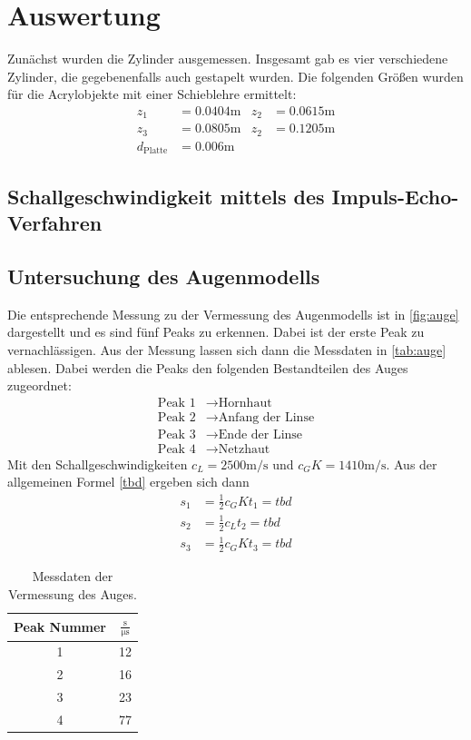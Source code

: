 \section{Auswertung}
\label{sec:Auswertung}

Zunächst wurden die Zylinder ausgemessen. Insgesamt gab es vier verschiedene Zylinder, die gegebenenfalls auch gestapelt wurden.
Die folgenden Größen wurden für die Acrylobjekte mit einer Schieblehre ermittelt:
\begin{align*}
  z_1 &= 0.0404 \unit\meter & z_2 &= 0.0615 \unit\meter \\
  z_3 &= 0.0805 \unit\meter & z_2 &= 0.1205 \unit\meter \\
  d_\text{Platte} &= 0.006 \unit\meter
\end{align*}

\subsection{Schallgeschwindigkeit mittels des Impuls-Echo-Verfahren}

\subsection{Untersuchung des Augenmodells}

Die entsprechende Messung zu der Vermessung des Augenmodells ist in \autoref{fig:auge} dargestellt
und es sind fünf Peaks zu erkennen. Dabei ist der erste Peak zu vernachlässigen.
Aus der Messung lassen sich dann die Messdaten in \autoref{tab:auge} ablesen.
Dabei werden die Peaks den folgenden Bestandteilen des Auges zugeordnet:
\begin{align*}
  \text{Peak 1} &\to \text{Hornhaut} \\
  \text{Peak 2} &\to \text{Anfang der Linse} \\
  \text{Peak 3} &\to \text{Ende der Linse} \\
  \text{Peak 4} &\to \text{Netzhaut}
\end{align*}
Mit den Schallgeschwindigkeiten $c_L = 2500 \unit{\meter / \second}$ und $c_GK = 1410 \unit{\meter / \second}$.
Aus der allgemeinen Formel \ref{tbd} ergeben sich dann
\begin{align*}
  s_1 &= \frac{1}{2} c_GK t_1 = tbd \\
  s_2 &= \frac{1}{2} c_L t_2 = tbd \\
  s_3 &= \frac{1}{2} c_GK t_3 = tbd
\end{align*}


\begin{table}
  \centering
  \caption{Messdaten der Vermessung des Auges.}
  \label{tab:auge}
  \begin{tabular}{c c}
      \toprule
      Peak Nummer & $\frac{\unit\second} {\unit{\micro\second}}$ \\ 
      \midrule
      1 & 12 \\
      2 & 16 \\
      3 & 23 \\
      4 & 77 \\
      \bottomrule
  \end{tabular}
\end{table}

